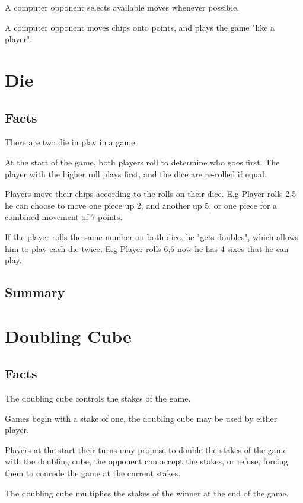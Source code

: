 \documentclass{report}
\begin{document}
\begin{dashed}
    \item A computer opponent selects available moves whenever possible.
    \item A computer opponent moves chips onto points, and plays
    the game "like a player".
\end{dashed}

\section{Die}

\subsection{Facts}

\begin{dashed}
    \item There are two die in play in a game.
    \item At the start of the game, both players roll to determine who goes first.
    The player with the higher roll plays first, and the dice are re-rolled if equal.
    \item Players move their chips according to the rolls on their dice.
    E.g Player rolls 2,5 he can choose to move one piece up 2, and another up 5,
    or one piece for a combined movement of 7 points.
    \item If the player rolls the same number on both dice, he "gets doubles", which
    allows him to play each die twice.
    E.g Player rolls 6,6 now he has 4 sixes that he can play.
    \item
\end{dashed}

\subsection{Summary}

\section{Doubling Cube}

\subsection{Facts}

\begin{dashed}
    \item The doubling cube controls the stakes of the game.
    \item Games begin with a stake of one, the doubling cube may be used by either player.
    \item Players at the start their turns may propose to double the stakes of the game
    with the doubling cube, the opponent can accept the stakes, or refuse, forcing them
    to concede the game at the current stakes.
    \item The doubling cube multiplies the stakes of the winner at the end of the game.
\end{dashed}
\end{document}
